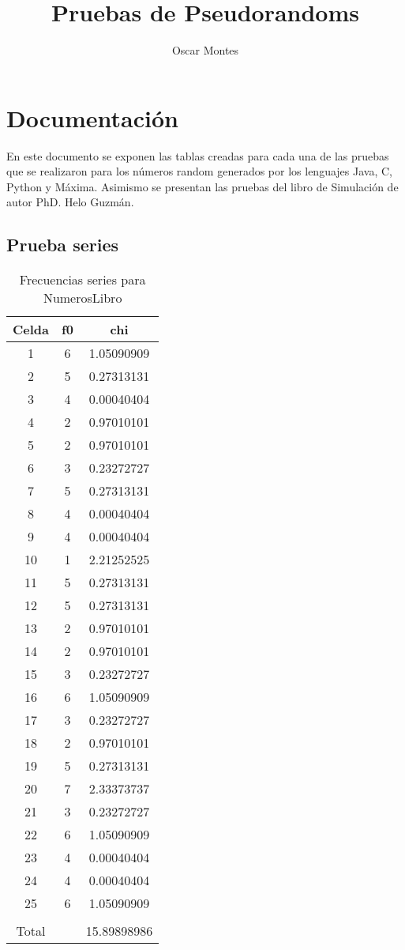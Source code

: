 \documentclass[a4paper]{article}
\title{Pruebas de Pseudorandoms}
\author{Oscar Montes}
\begin{document}
\maketitle


\section{Documentación}
En este documento se exponen las tablas creadas para cada una de las pruebas que se realizaron para los números random generados por los lenguajes Java, C, Python y Máxima. Asimismo se presentan las pruebas del libro de Simulación de autor PhD. Helo Guzmán.


\subsection{Prueba series}
\begin{table}
\centering
\begin{tabular}{ccc}
\\\hline
Celda&f0&chi\\\hline
1&6&1.05090909\\
2&5&0.27313131\\
3&4&0.00040404\\
4&2&0.97010101\\
5&2&0.97010101\\
6&3&0.23272727\\
7&5&0.27313131\\
8&4&0.00040404\\
9&4&0.00040404\\
10&1&2.21252525\\
11&5&0.27313131\\
12&5&0.27313131\\
13&2&0.97010101\\
14&2&0.97010101\\
15&3&0.23272727\\
16&6&1.05090909\\
17&3&0.23272727\\
18&2&0.97010101\\
19&5&0.27313131\\
20&7&2.33373737\\
21&3&0.23272727\\
22&6&1.05090909\\
23&4&0.00040404\\
24&4&0.00040404\\
25&6&1.05090909\\
\\\hline
Total & &15.89898986\\\hline
\end{tabular}
\caption{\label{tab:frecseriesNumerosLibro}Frecuencias series para NumerosLibro}
\end{table}
\end{document}
